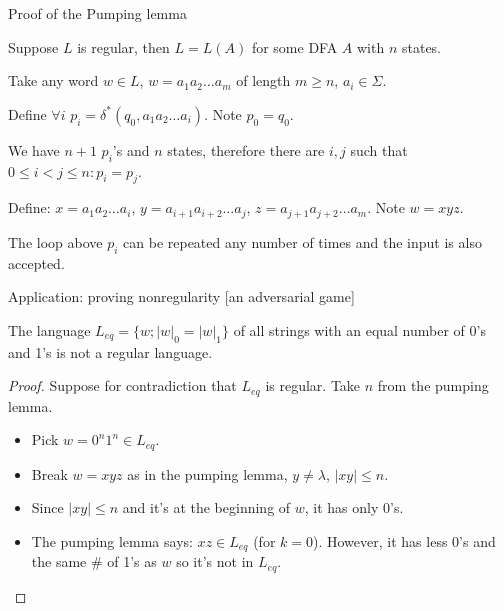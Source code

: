 \documentclass[handout]{beamer}
\begin{document}
\begin{frame}{Proof of the Pumping lemma}

    Suppose $L$ is regular, then $L=L(A)$ for some DFA $A$ with $n$ states.
        
    Take any word $w\in L$, $w=a_1a_2\ldots a_m$ of length $m\geq n$, $a_i\in \Sigma$. 
    
    Define $\forall i$ $p_i=\delta^*(q_0,a_1a_2\ldots a_i)$. Note $p_0=q_0$.
    
    We have $n+1$ $p_i$'s and $n$ states, therefore there are $i,j$ such that $0\leq i< j\leq n: p_i=p_j$.
    
    Define: $x=a_1a_2\ldots a_i$, $y=a_{i+1}a_{i+2}\ldots a_j$, $z=a_{j+1}a_{j+2}\ldots a_m$. Note $w=xyz$.
       
    \begin{center}
    \end{center}
            

    The loop above $p_i$ can be repeated any number of times and the input is also accepted.\hfill\qedsymbol

\end{frame}


\begin{frame}{Application: proving nonregularity [an adversarial game]}

    \begin{example}
		The language $L_{eq}=\{w; |w|_0=|w|_1\}$ of all strings with an equal number of 0's and 1's is not a regular language.
	\end{example}
	\begin{proof}
        Suppose for contradiction that $L_{eq}$ is regular. Take $n$ from the pumping lemma.
        \begin{itemize}
            \item Pick $w=0^n1^n\in L_{eq}$.
            \item Break $w=xyz$ as in the pumping lemma, $y\neq \lambda$, $|xy|\leq n$.
            \item Since $|xy|\leq n$ and it's at the beginning of $w$, it has only 0's. 
            \item The pumping lemma says: $xz\in L_{eq}$ (for $k=0$). However, it has less 0's and the same \# of 1's as $w$ so it's not in $L_{eq}$.
        \end{itemize} 
        \vspace{-24pt}  
	\end{proof}

\end{frame}
\end{document}
